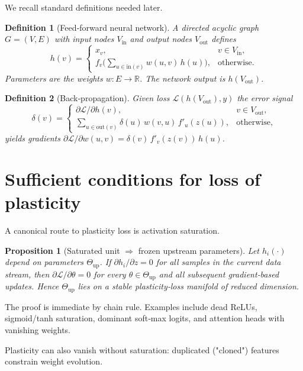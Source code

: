 \documentclass{article}
\newcommand{\Loss}{\mathcal{L}}
\newcommand{\R}{\mathbb{R}}
\newtheorem{definition}{Definition}[section]
\newtheorem{proposition}{Proposition}[section]
\begin{document}
We recall standard definitions needed later.

\begin{definition}[Feed‑forward neural network]
A directed acyclic graph $G=(V,E)$ with input nodes $V_{\text{in}}$ and output nodes $V_{\text{out}}$ defines
\[
h(v)=
\begin{cases}
x_v, & v\in V_{\text{in}},\\
f_v\!\bigl(\sum_{u\!\in\!\mathrm{in}(v)}w(u,v)\,h(u)\bigr), &\text{otherwise}.
\end{cases}
\]
Parameters are the weights $w:E\to\R$.  The network output is $h(V_{\text{out}})$.
\end{definition}

\begin{definition}[Back‑propagation]
Given loss $\Loss(h(V_{\text{out}}),y)$ the error signal
\[
\delta(v)=
\begin{cases}
\partial\Loss/\partial h(v), & v\in V_{\text{out}},\\[4pt]
\displaystyle\sum_{u\in\mathrm{out}(v)}\delta(u)\,w(v,u)\,f'_u(z(u)), &\text{otherwise},
\end{cases}
\]
yields gradients $\partial\Loss/\partial w(u,v)=\delta(v)\,f'_v(z(v))\,h(u)$.\qedhere
\end{definition}

\section{Sufficient conditions for loss of plasticity}
\label{sec:frozen}

A canonical route to plasticity loss is activation saturation.

\begin{proposition}[Saturated unit $\Rightarrow$ frozen upstream parameters]
\label{prop:saturated}
Let $h_i(\cdot)$ depend on parameters $\Theta_{\text{up}}$.  If
\(
\partial h_i/\partial z = 0
\)
for all samples in the current data stream, then
\(
\partial\Loss/\partial\theta = 0
\)
for every $\theta\in\Theta_{\text{up}}$ and all subsequent gradient‑based updates.  Hence $\Theta_{\text{up}}$ lies on a stable plasticity‑loss manifold of reduced dimension.
\end{proposition}

The proof is immediate by chain rule. Examples include dead ReLUs, sigmoid/tanh saturation, dominant soft‑max logits, and attention heads with vanishing weights.

Plasticity can also vanish without saturation: duplicated ("cloned") features constrain weight evolution.
\end{document}
